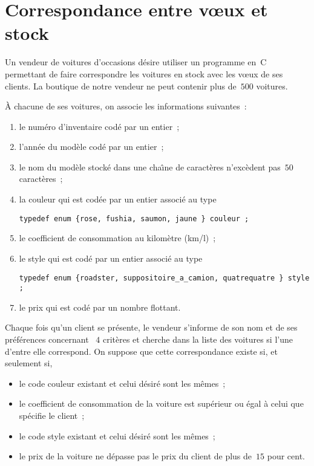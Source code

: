 \section{Correspondance entre v\oe{}ux et stock}
\label{sec:Correspondance}
Un vendeur de voitures d'occasions d\'esire utiliser un programme en~C
permettant de  faire correspondre  les  voitures  en stock  avec   les
v\oe{}ux de ses clients. La boutique de notre vendeur ne peut contenir
plus de~$500$ voitures.
\par
\`A chacune  de  ses  voitures,  on associe  les informations suivantes~:
\begin{enumerate}
\item le num\'ero d'inventaire cod\'e par un entier~;
\item l'ann\'ee du mod\`ele cod\'e par un entier~;
\item le nom du mod\`ele stock\'e dans une cha\^\i{}ne de caract\`eres
  n'exc\`edent pas~$50$ caract\`eres~;
\item la couleur qui est cod\'ee par un entier associ\'e au type
\begin{verbatim}
typedef enum {rose, fushia, saumon, jaune } couleur ;
\end{verbatim}
\item le coefficient de consommation au kilom\`etre (km/l)~;
\item le style  qui est  cod\'e par  un entier  associ\'e au  type
\begin{verbatim}
typedef enum {roadster, suppositoire_a_camion, quatrequatre } style ;
\end{verbatim}
\item le prix qui est cod\'e par un nombre flottant.
\end{enumerate}
Chaque fois qu'un client se   pr\'esente, le vendeur s'informe de  son
nom et de ses  pr\'ef\'erences  concernant ~$4$ crit\`eres et  cherche
dans la  liste  des voitures si l'une    d'entre elle correspond.   On
suppose que cette correspondance existe si, et seulement si,
\begin{itemize}
\item le code couleur existant et celui d\'esir\'e sont les m\^emes~;
\item le coefficient  de consommation de  la voiture est sup\'erieur ou
  \'egal \`a celui que sp\'ecifie le client~;
\item le code style existant et celui d\'esir\'e sont les m\^emes~;
\item le prix de la voiture ne d\'epasse pas le prix du client de plus
  de~$15$ pour cent.
\end{itemize}

